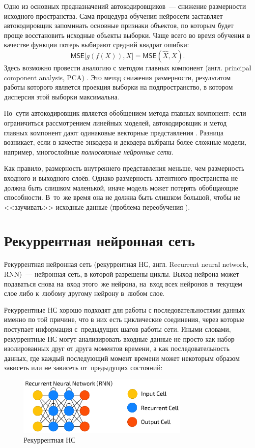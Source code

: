 Одно из основных предназначений автокодировщиков~--- снижение размерности исходного 
пространства. Сама процедура обучения нейросети заставляет автокодировщик запоминать 
основные признаки объектов, по которым будет проще восстановить исходные объекты выборки.
Чаще всего во время обучения в качестве функции потерь выбирают средний квадрат ошибки:
\[
	\mathsf{MSE}\bigl[g(f(X)), X\bigr] = \mathsf{MSE}(\hat{X}, X).
\]
Здесь возможно провести аналогию с методом главных компонент 
(англ. principal component analysis, PCA) \cite{pca}. 
Это метод снижения размерности, результатом работы которого является 
проекция выборки на подпространство, в котором дисперсия этой выборки максимальна.

По~сути автокодировщик является обобщением метода главных компонент: 
если ограничиться рассмотрением линейных моделей, автокодировщик 
и метод главных компонент дают одинаковые векторные представления \cite{autoenc_vs_pca}. 
Разница возникает, если в качестве энкодера и декодера выбраны
более сложные модели, например, многослойные \textit{полносвязные нейронные сети}.

\pagebreak
Как правило, размерность внутреннего представления меньше, чем размерность входного 
и выходного слоёв. Однако размерность латентного пространства не должна быть слишком маленькой,
иначе модель может потерять обобщающие способности. В~то~же время она не должна быть слишком
большой, чтобы не <<заучивать>> исходные данные (проблема переобучения \cite{overfeed}).


\section{Рекуррентная нейронная сеть}

Рекуррентная нейронная сеть (рекуррентная НС, англ. Recurrent neural network, RNN)~--- нейронная сеть, в которой разрешены циклы. 
Выход нейрона может подаваться снова на~вход этого~же нейрона,
на~вход всех нейронов в~текущем слое либо к~любому другому нейрону в~любом слое.

Рекуррентные НС хорошо подходят для работы с последовательностями данных именно по той причине, что
в них есть циклические соединения, через которые поступает информация с~предыдущих шагов
работы сети. Иными словами, рекуррентные НС могут анализировать входные данные не просто 
как набор изолированных друг от друга моментов времени, а как последовательность данных, 
где каждый последующий момент времени может некоторым образом зависеть или не зависеть от~предыдущих состояний:
\begin{figure}[!h]
	\centering
	\includegraphics[width=0.75\textwidth]{pics/RNN}
	\caption{Рекуррентная НС}
	\label{RNN}
\end{figure}

